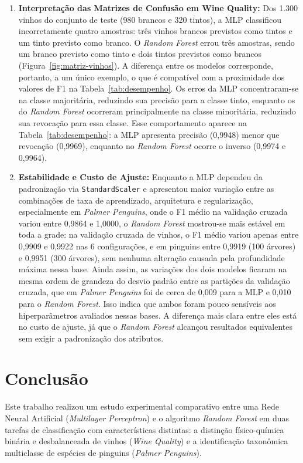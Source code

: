 \documentclass[12pt, oneside, a4paper, english, brazilian]{abntex2}
\begin{document}
\begin{enumerate}
  \item \textbf{Interpretação das Matrizes de Confusão em Wine Quality:} Dos 1.300 vinhos do conjunto de teste (980 brancos e 320 tintos), a MLP classificou incorretamente quatro amostras: três vinhos brancos previstos como tintos e um tinto previsto como branco. O \textit{Random Forest} errou três amostras, sendo um branco previsto como tinto e dois tintos previstos como brancos (Figura~\ref{fig:matriz-vinhos}). A diferença entre os modelos corresponde, portanto, a um único exemplo, o que é compatível com a proximidade dos valores de F1 na Tabela~\ref{tab:desempenho}. Os erros da MLP concentraram-se na classe majoritária, reduzindo sua precisão para a classe tinto, enquanto os do \textit{Random Forest} ocorreram principalmente na classe minoritária, reduzindo sua revocação para essa classe. Esse comportamento aparece na Tabela~\ref{tab:desempenho}: a MLP apresenta precisão (0,9948) menor que revocação (0,9969), enquanto no \textit{Random Forest} ocorre o inverso (0,9974 e 0,9964).
  \item \textbf{Estabilidade e Custo de Ajuste:} Enquanto a MLP dependeu da padronização via \texttt{StandardScaler} e apresentou maior variação entre as combinações de taxa de aprendizado, arquitetura e regularização, especialmente em \textit{Palmer Penguins}, onde o F1 médio na validação cruzada variou entre 0,9864 e 1,0000, o \textit{Random Forest} mostrou-se mais estável em toda a grade: na validação cruzada de vinhos, o F1 médio variou apenas entre 0,9909 e 0,9922 nas 6 configurações, e em pinguins entre 0,9919 (100 árvores) e 0,9951 (300 árvores), sem nenhuma alteração causada pela profundidade máxima nessa base. Ainda assim, as variações dos dois modelos ficaram na mesma ordem de grandeza do desvio padrão entre as partições da validação cruzada, que em \textit{Palmer Penguins} foi de cerca de 0,009 para a MLP e 0,010 para o \textit{Random Forest}. Isso indica que ambos foram pouco sensíveis aos hiperparâmetros avaliados nessas bases. A diferença mais clara entre eles está no custo de ajuste, já que o \textit{Random Forest} alcançou resultados equivalentes sem exigir a padronização dos atributos.
\end{enumerate}

\chapter{Conclusão}

Este trabalho realizou um estudo experimental comparativo entre uma Rede Neural Artificial (\textit{Multilayer Perceptron}) e o algoritmo \textit{Random Forest} em duas tarefas de classificação com características distintas: a distinção físico-química binária e desbalanceada de vinhos (\textit{Wine Quality}) e a identificação taxonômica multiclasse de espécies de pinguins (\textit{Palmer Penguins}).
\end{document}
